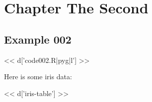 \chapter{Chapter The Second}

\section{Example 002}

<< d['code002.R|pyg|l'] >>

Here is some iris data:

<< d['iris-table'] >>


